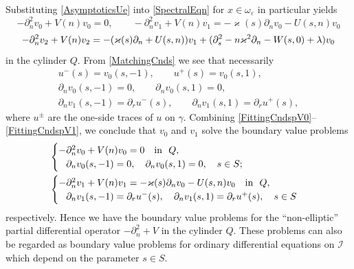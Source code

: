 \documentclass[reqno]{amsart}
\theoremstyle{plain}
\numberwithin{equation}{section}
\renewcommand{\kappa}{\varkappa}
\newcommand{\eps}{\varepsilon}
\newcommand{\cI}{\mathcal{I}}
\newcommand{\pte}{\partial_n}
\begin{document}
Substituting \eqref{AsymptoticsUe} into \eqref{SpectralEqn} for $x\in \omega_\eps$ in particular yields
\begin{equation}\label{EqnsV0V1}
-\pte^2 v_0+V(n)v_0=0,
\qquad
-\pte^2 v_1+V(n)v_1=-\kappa(s)\pte v_0-U(s,n)v_0
\end{equation}
\begin{equation}\label{EqnV2}
  -\pte^2 v_2+V(n)v_2=-(\kappa(s)\pte +U(s,n)) v_1\\
  +(\partial^2_s-n\kappa^2\partial_n-W(s,0)+\lambda)v_0
\end{equation}
in the cylinder $Q$.
From \eqref{MatchingCnds} we see that necessarily
\begin{gather}\label{FittingCndsUV0}
 u^-(s)=v_0(s,-1),\qquad u^+(s)=v_0(s,1),
 \\\label{FittingCndspV0}
 \partial_n v_0(s,- 1)=0, \qquad \partial_n v_0(s, 1)=0, \\\label{FittingCndspV1}
 \partial_n v_1(s, -1)=\partial_r u^-(s), \qquad
 \partial_n v_1(s, 1)=\partial_r u^+(s),
\end{gather}
where $u^\pm$ are the one-side traces of $u$ on $\gamma$.
Combining \eqref{FittingCndspV0}--\eqref{FittingCndspV1}, we conclude that $v_0$ and $v_1$ solve the boundary value problems
\begin{align}\label{problemV0}
&\begin{cases}
  -\pte^2 v_0+V(n)v_0=0 \quad \hbox{in \ } Q, \\
    \phantom{-}\partial_n v_0(s,- 1)=0, \quad \partial_n v_0(s, 1)=0, \quad s\in S;
\end{cases}
\\\label{problemV1}
&\begin{cases}
  -\pte^2 v_1+V(n)v_1=-\kappa(s)\pte v_0-U(s,n)v_0\quad \hbox{in \ } Q, \\
    \phantom{-}\partial_n v_1(s, -1)=\partial_r u^-(s), \quad
\partial_n v_1(s, 1)=\partial_r u^+(s), \quad s\in S
\end{cases}
\end{align}
respectively. Hence we have the boundary value problems for the ``non-ellip\-tic'' partial differential operator $-\pte^2+V$ in the cylinder $Q$. These problems can also be  regarded as  boun\-da\-ry value problems for ordinary differential equations on $\cI$ which depend on the parameter $s\in S$.
\end{document}
